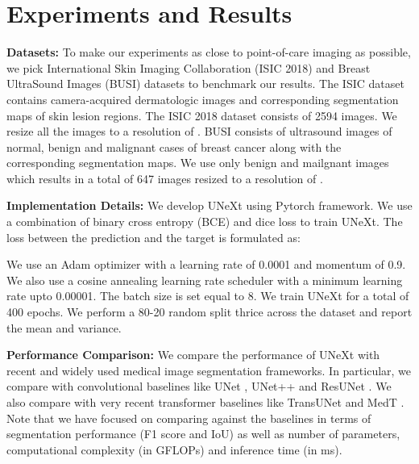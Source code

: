 \documentclass[runningheads]{llncs}
\begin{document}
\section{Experiments and Results}

\noindent \textbf{Datasets:} To make our experiments as close to point-of-care imaging as possible, we pick International Skin Imaging Collaboration (ISIC 2018) \cite{codella2018skin} and Breast UltraSound Images (BUSI) \cite{al2020dataset} datasets to benchmark our results. The ISIC dataset  contains camera-acquired dermatologic images and corresponding segmentation maps of skin lesion regions. The ISIC 2018 dataset consists of 2594 images. We resize all the images to a resolution of . BUSI consists of ultrasound images of normal, benign and malignant cases of breast cancer along with the corresponding segmentation maps. We use only benign and mailgnant images which results in a total of 647 images resized to a resolution of . 

\noindent \textbf{Implementation Details:} We develop UNeXt using Pytorch framework. We use a combination of binary cross entropy (BCE) and dice loss to train UNeXt. The loss  between the prediction  and the target  is formulated as:


We use an Adam optimizer with a learning rate of 0.0001 and momentum of 0.9. We also use a cosine annealing learning rate scheduler with a minimum learning rate upto 0.00001. The batch size is set equal to 8. We train UNeXt for a total of 400 epochs. We perform a 80-20 random split thrice across the dataset and report the mean and variance.

\noindent \textbf{Performance Comparison:} We compare the performance of UNeXt with recent and widely used medical image segmentation frameworks. In particular, we compare with convolutional baselines like UNet \cite{ronneberger2015u}, UNet++ \cite{zhou2018unet++} and ResUNet \cite{zhang2018road}. We also compare with very recent transformer baselines like TransUNet \cite{chen2021transunet} and MedT \cite{jose2021medical}. Note that we have focused on comparing against the baselines in terms of segmentation performance (F1 score and IoU) as well as number of parameters, computational complexity (in GFLOPs) and inference time (in ms). 
\end{document}
